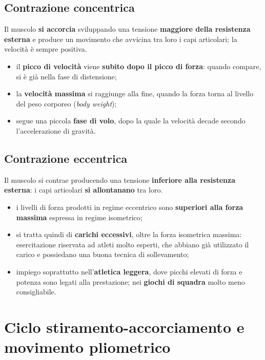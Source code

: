\subsection{Contrazione concentrica}

Il muscolo \textbf{si accorcia} sviluppando una tensione \textbf{maggiore della resistenza
esterna} e produce un movimento che avvicina tra loro i capi articolari; la velocità è sempre
positiva.

\begin{itemize}
  \item il \textbf{picco di velocità} viene \textbf{subito dopo il picco di forza}: quando
    compare, si è già nella fase di distensione;
  \item la \textbf{velocità massima} si raggiunge alla fine, quando la forza torna al livello del
    peso corporeo (\textit{body weight});
  \item segue una piccola \textbf{fase di volo}, dopo la quale la velocità decade secondo
    l'accelerazione di gravità.
\end{itemize}

\subsection{Contrazione eccentrica}

Il muscolo si contrae producendo una tensione \textbf{inferiore alla resistenza esterna}: i capi
articolari \textbf{si allontanano} tra loro.

\begin{itemize}
  \item i livelli di forza prodotti in regime eccentrico sono \textbf{superiori alla forza
    massima} espressa in regime isometrico;
  \item si tratta quindi di \textbf{carichi eccessivi}, oltre la forza isometrica massima:
    esercitazione riservata ad atleti molto esperti, che abbiano già utilizzato il carico e
    possiedano una buona tecnica di sollevamento;
  \item impiego soprattutto nell'\textbf{atletica leggera}, dove picchi elevati di forza e
    potenza sono legati alla prestazione; nei \textbf{giochi di squadra} molto meno consigliabile.
\end{itemize}

\section{Ciclo stiramento-accorciamento e movimento pliometrico}

